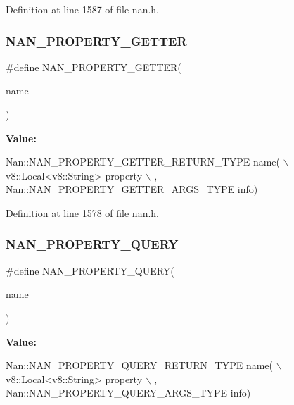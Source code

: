 Definition at line 1587 of file nan.\+h.

\mbox{\label{nan_8h_a61a4f2a1c534c7eae8683203ef3cd692}} 
\subsubsection{N\+A\+N\+\_\+\+P\+R\+O\+P\+E\+R\+T\+Y\+\_\+\+G\+E\+T\+T\+ER}
{\footnotesize\ttfamily \#define N\+A\+N\+\_\+\+P\+R\+O\+P\+E\+R\+T\+Y\+\_\+\+G\+E\+T\+T\+ER(\begin{DoxyParamCaption}\item[{}]{name }\end{DoxyParamCaption})}

{\bfseries Value\+:}
\begin{DoxyCode}
Nan::NAN_PROPERTY_GETTER_RETURN_TYPE name(                                 \(\backslash\)
        v8::Local<v8::String> property                                         \(\backslash\)
      , Nan::NAN_PROPERTY_GETTER_ARGS_TYPE info)
\end{DoxyCode}


Definition at line 1578 of file nan.\+h.

\mbox{\label{nan_8h_ad652bc3f949951a7d1907d9d3eb8bf7b}} 
\subsubsection{N\+A\+N\+\_\+\+P\+R\+O\+P\+E\+R\+T\+Y\+\_\+\+Q\+U\+E\+RY}
{\footnotesize\ttfamily \#define N\+A\+N\+\_\+\+P\+R\+O\+P\+E\+R\+T\+Y\+\_\+\+Q\+U\+E\+RY(\begin{DoxyParamCaption}\item[{}]{name }\end{DoxyParamCaption})}

{\bfseries Value\+:}
\begin{DoxyCode}
Nan::NAN_PROPERTY_QUERY_RETURN_TYPE name(                                  \(\backslash\)
        v8::Local<v8::String> property                                         \(\backslash\)
      , Nan::NAN_PROPERTY_QUERY_ARGS_TYPE info)
\end{DoxyCode}


